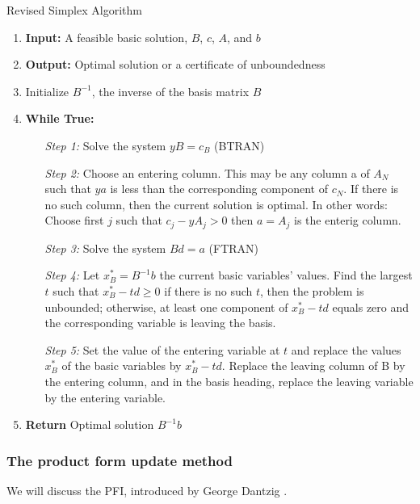 \begin{algorithm}
    \caption{Revised Simplex Algorithm}
    \begin{enumerate}
        \item \textbf{Input:} A feasible basic solution, \( B \), \( c \), \( A \), and \( b \)
        \item \textbf{Output:} Optimal solution or a certificate of unboundedness
        \item Initialize \( B^{-1} \), the inverse of the basis matrix \( B \)
        \item \textbf{While True:}
        \begin{itemize}
            \setlength{\itemindent}{3em}
            \item[\textit{Step 1:}] Solve the system \( yB = c_B \) (BTRAN)
            \item[\textit{Step 2:}] Choose an entering column. This may be any column a of
            $A_N$ such that $ya$ is less than the corresponding component
            of $c_N$. If there is no such column, then the current solution is optimal.
            In other words: Choose first \( j \) such that \( c_j -yA_j > 0 \) 
            then $a=A_j$ is the enterig column.
            \item[\textit{Step 3:}] Solve the system $Bd = a$ (FTRAN)
            \item[\textit{Step 4:}] Let $x_B^{\ast} = B^{-1}b$ the current basic variables' values.
            Find the largest $t$ such that \( x_B^{\ast} - td \geq 0\)
                if there is no such $t$, then the problem is unbounded; otherwise, at least 
                one component of  \( x_B^{\ast} - td \) equals zero and the corresponding variable is leaving the basis.
            \item[\textit{Step 5:}] Set the value of the entering variable at 
            $t$ and replace the values $x_B^{\ast}$ of the basic variables by \( x_B^{\ast} - td \).
            Replace the leaving column of B by the entering column, and in the basis heading,
            replace the leaving variable by the entering variable.
        \end{itemize}
        
        \item \textbf{Return} Optimal solution \( B^{-1}b \)
    \end{enumerate}
    \end{algorithm} 

\subsubsection*{The product form update method}
We will discuss the PFI, introduced by George Dantzig \parencite{dantzig1954product}.
